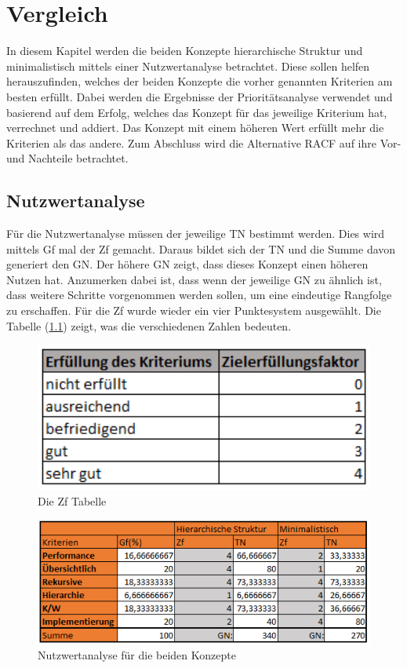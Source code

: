 \chapter{Vergleich}
\label{ch:chapter05}
In diesem Kapitel werden die beiden Konzepte hierarchische Struktur und minimalistisch mittels einer Nutzwertanalyse betrachtet.
Diese sollen helfen herauszufinden, welches der beiden Konzepte die vorher genannten Kriterien am besten erfüllt.
Dabei werden die Ergebnisse der Prioritätsanalyse verwendet und basierend auf dem Erfolg, welches das Konzept für das jeweilige Kriterium hat, verrechnet und addiert.
Das Konzept mit einem höheren Wert erfüllt mehr die Kriterien als das andere.
Zum Abschluss wird die Alternative \ac{RACF} auf ihre Vor- und Nachteile betrachtet.

\section{Nutzwertanalyse}
\label{sec:chapter05:Nutz}
Für die Nutzwertanalyse müssen der jeweilige \ac{TN} bestimmt werden.
Dies wird mittels \ac{Gf} mal der \ac{Zf} gemacht.
Daraus bildet sich der \ac{TN} und die Summe davon generiert den \ac{GN}.
Der höhere \ac{GN} zeigt, dass dieses Konzept einen höheren Nutzen hat.
Anzumerken dabei ist, dass wenn der jeweilige \ac{GN} zu ähnlich ist, dass weitere Schritte vorgenommen werden sollen, um eine eindeutige Rangfolge zu erschaffen.
Für die \ac{Zf} wurde wieder ein vier Punktesystem ausgewählt.
Die Tabelle (\ref{fig:Ziel}) zeigt, was die verschiedenen Zahlen bedeuten. \cite{BdIufH}
\begin{figure}[h!]
 \centering
 \includegraphics[width=1\textwidth]{gfx/Picture/Ziel.PNG}
 \caption{Die Zf Tabelle}
 \label{fig:Ziel}
\end{figure}
\newpage
\begin{figure}[h!]
 \centering
 \includegraphics[width=1\textwidth]{gfx/Picture/Nutzwert.PNG}
 \caption{Nutzwertanalyse für die beiden Konzepte}
 \label{fig:Nutz}
\end{figure}

